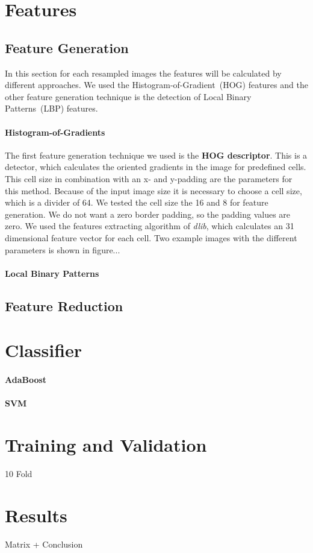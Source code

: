 \documentclass[a4paper,10pt]{article}
\begin{document}
\section{Features}
\subsection{Feature Generation}

In this section for each resampled images the features will be calculated by different approaches.
We used the Histogram-of-Gradient~(HOG) features and the other feature generation technique is the detection of Local Binary Patterns~(LBP) features.
\paragraph{Histogram-of-Gradients}

The first feature generation technique we used is the \textbf{HOG descriptor}.
This is a detector, which calculates the oriented gradients in the image for predefined cells. 
This cell size in combination with an x- and y-padding are the parameters for this method.
Because of the input image size it is necessary to choose a cell size, which is a divider of 64. 
We tested the cell size the 16 and 8 for feature generation. We do not want a zero border padding, so the padding values are zero. 
We used the features extracting algorithm of \emph{dlib}, which calculates an 31 dimensional feature vector for each cell.
Two example images with the different parameters is shown in figure...
\paragraph{Local Binary Patterns}


\subsection{Feature Reduction}


\section{Classifier}
\paragraph{AdaBoost}
\paragraph{SVM}

\section{Training and Validation}
10 Fold

\section{Results}
Matrix + Conclusion 
\end{document}
